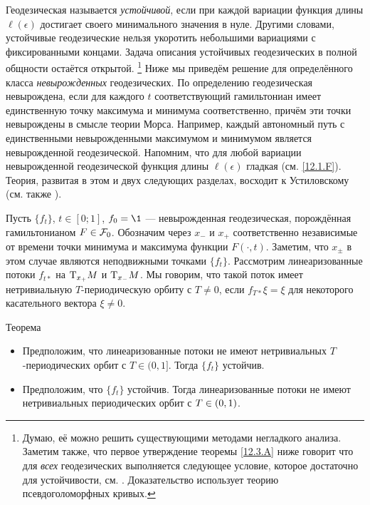 Геодезическая называется \emph{устойчивой}, если при каждой вариации функция длины $\ell(\epsilon)$ достигает своего минимального значения в нуле.
Другими словами, устойчивые геодезические нельзя укоротить небольшими вариациями с фиксированными концами.
Задача описания устойчивых геодезических в полной общности остаётся открытой.%
\footnote{Думаю, её можно решить существующими методами негладкого анализа.
Заметим также, что первое утверждение теоремы \ref{12.3.A} ниже говорит что для {}\emph{всех} геодезических выполняется следующее условие, которое достаточно для устойчивости, см. \cite{LM3}.
Доказательство использует теорию псевдоголоморфных кривых.}
Ниже мы приведём решение для определённого класса \emph{невырожденных} геодезических.
По определению геодезическая невырождена, если для каждого $t$ соответствующий гамильтониан имеет единственную точку максимума и минимума соответственно, причём эти точки невырождены в смысле теории Морса.
Например, каждый автономный путь с единственными невырожденными максимумом и минимумом является невырожденной геодезической.
Напомним, что для любой вариации невырожденной геодезической функция длины $\ell(\epsilon)$ гладкая (см. \ref{12.1.F}).
Теория, развитая в этом и двух следующих разделах, восходит к Устиловскому \cite{U} (см. также \cite{LM2}).

Пусть $\{f_t\}$, $t \in [0; 1]$, $f_0 = \1$ — невырожденная геодезическая, порождённая гамильтонианом $F\in \mathcal{F}_0$.
Обозначим через $x_-$ и $x_+$ соответственно независимые от времени точки минимума и максимума функции $F(\cdot, t)$.
Заметим, что $x_\pm$ в этом случае являются неподвижными точками $\{f_t\}$.
Рассмотрим линеаризованные потоки $f_{t*}$ на $\mathrm{T}_{x_+}M$ и $\mathrm{T}_{x_-}M$.
Мы говорим, что такой поток имеет нетривиальную $T$-периодическую орбиту с $T\ne0$, если $f_{T*}\xi=\xi$ для некоторого касательного вектора $\xi\ne0$.

\begin{thm}[(\cite{U})]{Теорема}\label{12.3.A}

\begin{itemize}
\item Предположим, что линеаризованные потоки не имеют нетривиальных $T$-периодических орбит с $T\in(0,1]$.
Тогда $\{f_t\}$ устойчив.
\item Предположим, что $\{f_t\}$ устойчив.
Тогда линеаризованные потоки не имеют нетривиальных периодических орбит с $T\z\in(0,1)$.
\end{itemize}
\end{thm}


